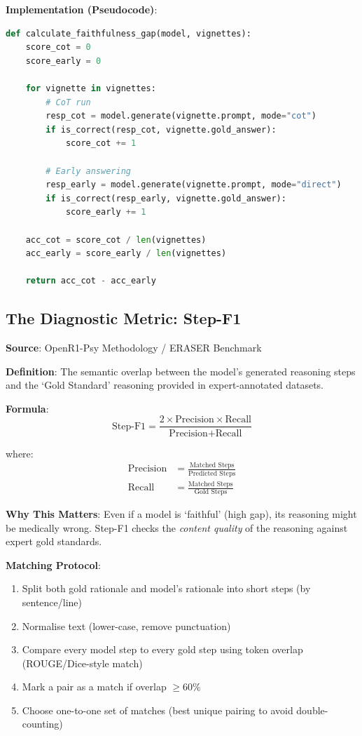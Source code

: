 \documentclass[11pt,a4paper]{article}
\begin{document}
\textbf{Implementation (Pseudocode)}:
\begin{lstlisting}[language=Python]
def calculate_faithfulness_gap(model, vignettes):
    score_cot = 0
    score_early = 0
    
    for vignette in vignettes:
        # CoT run
        resp_cot = model.generate(vignette.prompt, mode="cot")
        if is_correct(resp_cot, vignette.gold_answer):
            score_cot += 1
        
        # Early answering
        resp_early = model.generate(vignette.prompt, mode="direct")
        if is_correct(resp_early, vignette.gold_answer):
            score_early += 1
    
    acc_cot = score_cot / len(vignettes)
    acc_early = score_early / len(vignettes)
    
    return acc_cot - acc_early
\end{lstlisting}

\subsection{The Diagnostic Metric: Step-F1}

\textbf{Source}: OpenR1-Psy Methodology / ERASER Benchmark

\textbf{Definition}: The semantic overlap between the model's generated reasoning steps and the `Gold Standard' reasoning provided in expert-annotated datasets.

\textbf{Formula}:
\begin{equation}
\text{Step-F1} = \frac{2 \times \text{Precision} \times \text{Recall}}{\text{Precision} + \text{Recall}}
\end{equation}

where:
\begin{align*}
\text{Precision} &= \frac{\text{Matched Steps}}{\text{Predicted Steps}} \\
\text{Recall} &= \frac{\text{Matched Steps}}{\text{Gold Steps}}
\end{align*}

\textbf{Why This Matters}: Even if a model is `faithful' (high gap), its reasoning might be medically wrong. Step-F1 checks the \textit{content quality} of the reasoning against expert gold standards.

\textbf{Matching Protocol}:
\begin{enumerate}
    \item Split both gold rationale and model's rationale into short steps (by sentence/line)
    \item Normalise text (lower-case, remove punctuation)
    \item Compare every model step to every gold step using token overlap (ROUGE/Dice-style match)
    \item Mark a pair as a match if overlap $\geq 60\%$
    \item Choose one-to-one set of matches (best unique pairing to avoid double-counting)
\end{enumerate}
\end{document}
